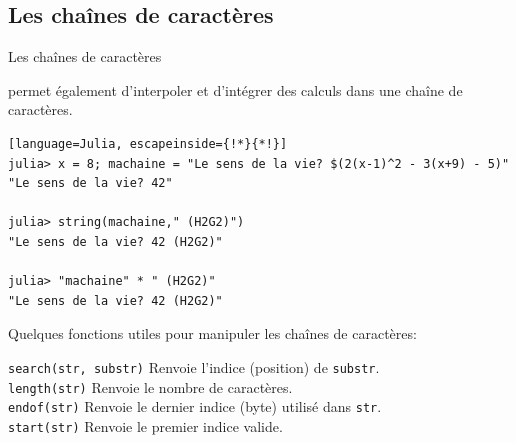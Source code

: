 \subsection{Les chaînes de caractères}
\begin{frame}[containsverbatim]{Les chaînes de caractères}
\par{{\Julia} permet également d'interpoler et d'intégrer des calculs dans une chaîne de caractères.}
\begin{lstlisting}[language=Julia, escapeinside={!*}{*!}]
julia> x = 8; machaine = "Le sens de la vie? $(2(x-1)^2 - 3(x+9) - 5)"
"Le sens de la vie? 42"

julia> string(machaine," (H2G2)")
"Le sens de la vie? 42 (H2G2)"

julia> "machaine" * " (H2G2)"
"Le sens de la vie? 42 (H2G2)"
\end{lstlisting}
\vspace{2ex}
\par{Quelques fonctions utiles pour manipuler les chaînes de caractères:}
\vspace{-2ex}
\begin{multicols}{2}
    {\small
         \texttt{search(str, substr)} Renvoie l'indice (position) de \texttt{substr}.\\
         \texttt{length(str)} Renvoie le nombre de caractères.\\
        \columnbreak
         \texttt{endof(str)} Renvoie le dernier indice (byte) utilisé dans \texttt{str}.\\
         \texttt{start(str)} Renvoie le premier indice valide.\\
    }
\end{multicols}
\end{frame}


